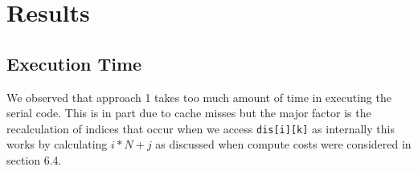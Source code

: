 \documentclass{article}
\begin{document}




\section{Results}
\subsection{Execution Time}
We observed that approach 1 takes too much amount of time in executing the serial code. This is in part due to cache misses but the major factor is the recalculation of indices that occur when we access \texttt{dis[i][k]} as internally this works by calculating $i*N+j$ as discussed when compute costs were considered in section 6.4.
\end{document}
